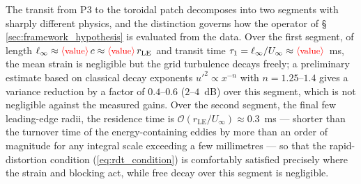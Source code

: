 \documentclass[lineno]{JFM-FLM_Au}
\newcommand{\tbd}[1]{\textcolor{red}{\ensuremath{\langle\mbox{\small #1}\rangle}}}
\begin{document}
The transit from P3 to the toroidal patch decomposes into two segments
with sharply different physics, and the distinction governs how the
operator of \S\,\ref{sec:framework_hypothesis} is evaluated from the
data. Over the first segment, of length
$\ell_\infty \approx \tbd{value}\,c \approx \tbd{value}\,r_{\mathrm{LE}}$
and transit time $\tau_1 = \ell_\infty/U_\infty \approx
\tbd{value}$~ms, the mean strain is negligible but the grid turbulence
decays freely; a preliminary estimate based on classical decay exponents
$u'^2 \propto x^{-n}$ with $n = 1.25$--$1.4$
\citep{ComteBellotCorrsin1971,Roach1987} gives a variance reduction by a
factor of $0.4$--$0.6$ ($2$--$4$~dB) over this segment, which is not
negligible against the measured gains. Over the second segment, the final
few leading-edge radii, the residence time is
$\mathcal{O}(r_{\mathrm{LE}}/U_\infty) \approx 0.3$~ms --- shorter than
the turnover time of the energy-containing eddies by more than an order
of magnitude for any integral scale exceeding a few millimetres --- so
that the rapid-distortion condition (\ref{eq:rdt_condition}) is
comfortably satisfied precisely where the strain and blocking act, while
free decay over this segment is negligible.
\end{document}
